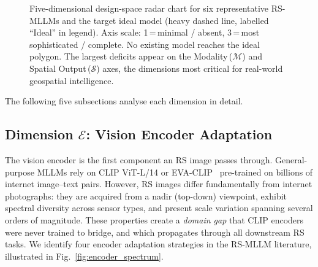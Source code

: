 \begin{figure}[h]
\caption{Five-dimensional design-space radar chart for six representative RS-MLLMs
and the target ideal model (heavy dashed line, labelled ``Ideal'' in legend).
Axis scale: 1\,=\,minimal / absent, 3\,=\,most sophisticated / complete.
No existing model reaches the ideal polygon.
The largest deficits appear on the Modality\,($\mathcal{M}$) and Spatial
Output\,($\mathcal{S}$) axes, the dimensions most critical for real-world
geospatial intelligence.}\label{fig:radar_5d}
\end{figure}

The following five subsections analyse each dimension in detail.

\subsection{Dimension \texorpdfstring{$\mathcal{E}$}{E}: Vision Encoder Adaptation}\label{sec3:encoder}

The vision encoder is the first component an RS image passes through. General-purpose
MLLMs rely on CLIP ViT-L/14 or EVA-CLIP~\cite{fang2023evaclip} pre-trained on billions of internet
image--text pairs. However, RS images differ fundamentally from internet photographs: they
are acquired from a nadir (top-down) viewpoint, exhibit spectral diversity across sensor
types, and present scale variation spanning several orders of magnitude. These properties
create a \emph{domain gap} that CLIP encoders were never trained to bridge, and which
propagates through all downstream RS tasks. We identify four encoder adaptation strategies
in the RS-MLLM literature, illustrated in Fig.~\ref{fig:encoder_spectrum}.

